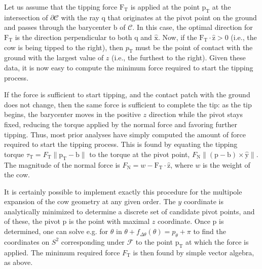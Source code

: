 \documentclass[
    prd, twocolumn, nofootinbib, amsmath, amssymb,
    aps, floatfix, preprintnumbers
]{revtex4-2}
\newcommand{\bb}[1]{\bm{\mathrm{#1}}}
\begin{document}
Let us assume that the tipping force $\bb F_{\mathrm{T}}$ is applied at the point $\bb p_{\mathrm{T}}$ at the intersection of $\partial\mathcal C$ with the ray $\bb q$ that originates at the pivot point on the ground and passes through the barycenter $\bb b$ of $\mathcal C$. In this case, the optimal direction for $\bb F_{\mathrm{T}}$ is the direction perpendicular to both $\bb q$ and $\bb{\hat x}$. Now, if the $\bb F_{\mathrm{T}}\cdot\bb{\hat z} > 0$ (i.e., the cow is being tipped to the right), then $p_{\mathrm{T}}$ must be the point of contact with the ground with the largest value of $z$ (i.e., the furthest to the right). Given these data, it is now easy to compute the minimum force required to start the tipping process.

If the force is sufficient to start tipping, and the contact patch with the ground does not change, then the same force is sufficient to complete the tip: as the tip begins, the barycenter moves in the positive $z$ direction while the pivot stays fixed, reducing the torque applied by the normal force and favoring further tipping. Thus, most prior analyses have simply computed the amount of force required to start the tipping process. This is found by equating the tipping torque $\tau_{\mathrm{T}} = F_{\mathrm{T}}\|\bb p_{\mathrm{T}} - \bb b\|$ to the torque at the pivot point, $F_{\mathrm{N}}\| (\bb p - \bb b)\times\bb{\hat y} \|$. The magnitude of the normal force is $F_{\mathrm{N}} = w - \bb F_{\mathrm{T}}\cdot\bb{\hat z}$, where $w$ is the weight of the cow.

It is certainly possible to implement exactly this procedure for the multipole expansion of the cow geometry at any given order. The $y$ coordinate is analytically minimized to determine a discrete set of candidate pivot points, and of these, the pivot $\bb p$ is the point with maximal $z$ coordinate. Once $\bb p$ is determined, one can solve e.g. for $\theta$ in $\theta + f_{\Delta\theta}(\theta) = p_\theta + \pi$ to find the coordinates on $S^2$ corresponding under $\mathcal F$ to the point $\bb p_{\mathrm T}$ at which the force is applied. The minimum required force $F_{\mathrm{T}}$ is then found by simple vector algebra, as above.
\end{document}

